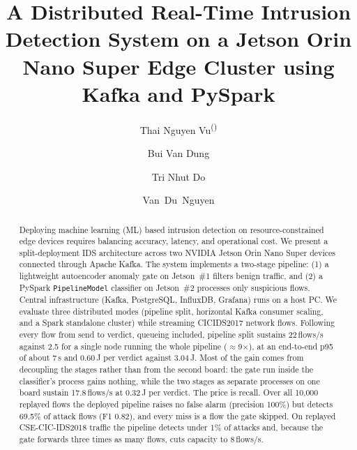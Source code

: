 \documentclass[runningheads]{llncs}
\begin{document}
\title{A Distributed Real-Time Intrusion Detection System on a Jetson Orin Nano Super Edge Cluster using Kafka and PySpark}


\author{Thai Nguyen Vu\textsuperscript{(\Letter)} \and
Bui Van Dung \and
Tri Nhut Do \and
Van~Du~Nguyen}



\maketitle

\begin{abstract}
Deploying machine learning (ML) based intrusion detection on resource-constrained edge devices requires balancing accuracy, latency, and operational cost. We present a split-deployment IDS architecture across two NVIDIA Jetson Orin Nano Super devices connected through Apache Kafka. The system implements a two-stage pipeline: (1) a lightweight autoencoder anomaly gate on Jetson~\#1 filters benign traffic, and (2) a PySpark \texttt{PipelineModel} classifier on Jetson~\#2 processes only suspicious flows. Central infrastructure (Kafka, PostgreSQL, InfluxDB, Grafana) runs on a host PC. We evaluate three distributed modes (pipeline split, horizontal Kafka consumer scaling, and a Spark standalone cluster) while streaming CICIDS2017 network flows. Following every flow from send to verdict, queueing included, pipeline split sustains 22\,flows/s against 2.5 for a single node running the whole pipeline ($\approx$9$\times$), at an end-to-end p95 of about 7\,s and 0.60\,J per verdict against 3.04\,J. Most of the gain comes from decoupling the stages rather than from the second board: the gate run inside the classifier's process gains nothing, while the two stages as separate processes on one board sustain 17.8\,flows/s at 0.32\,J per verdict. The price is recall. Over all 10{,}000 replayed flows the deployed pipeline raises no false alarm (precision 100\%) but detects 69.5\% of attack flows (F1 0.82), and every miss is a flow the gate skipped. On replayed CSE-CIC-IDS2018 traffic the pipeline detects under 1\% of attacks and, because the gate forwards three times as many flows, cuts capacity to 8\,flows/s.

\end{abstract}
\end{document}

